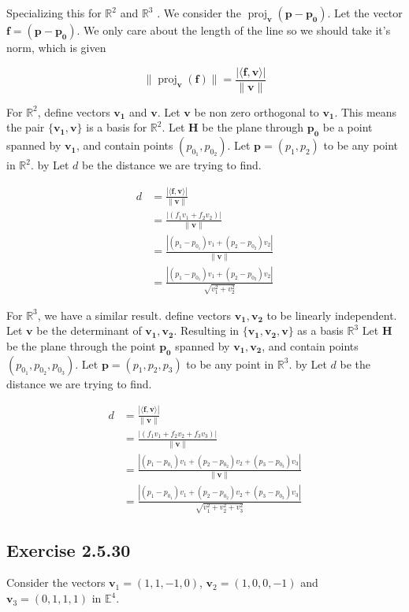\documentclass{tufte-book}
\DeclareMathOperator{\proj}{proj}
\newcommand{\vct}{\mathbf}
\newcommand{\dprod}[2]{\langle #1, #2 \rangle}
\theoremstyle{mytheoremstyle}
\theoremstyle{mylemstyle}
\theoremstyle{mydefstyle}
\begin{document}
Specializing this for $\mathbb{R}^2$ and $\mathbb{R}^3$ . We consider the $\proj_\vct{v}(\vct{p} - \vct{p_0})$.  Let the vector $\vct{f} = (\vct{p} - \vct{p_0})$.  We only care about the length of the line so we should take it's norm, which is given

\[ \|\proj_\vct{v}(\vct{f})\| = \frac{|\dprod{\vct{f}}{\vct{v}}|}{\|\vct{v}\|} \]

For $\mathbb{R}^2$, define vectors $\vct{v_1}$ and $\vct{v}$.  Let $\vct{v}$  be non zero orthogonal to $\vct{v_1}$.  This means the pair $\{\vct{v_1}, \vct{v}\}$ is a basis for $\mathbb{R}^2$.  Let $\mathbf{H}$ be the plane through $\vct{p_0}$ be a point spanned by $\vct{v_1}$, and contain points $(p_{0_1}, p_{0_2})$.  Let $\vct{p} = (p_1, p_2)$ to be any point in $\mathbb{R}^2$.  by Let $d$ be the distance we are trying to find.

\begin{align*}
d &= \frac{|\dprod{\vct{f}}{\vct{v}}|}{\|\vct{v}\|} \\
&= \frac{|(f_1v_1 + f_2v_2)|}{\|\vct{v}\|} \\
&= \frac{|(p_1 - p_{0_1})v_1 + (p_2-p_{0_2})v_2|}{\|\vct{v}\|}\\
&= \frac{|(p_1 - p_{0_1})v_1 + (p_2-p_{0_2})v_2|}{\sqrt{v_1^2 + v_2^2}}
\end{align*}

For $\mathbb{R}^3$, we have a similar result. define vectors $\vct{v_1},\vct{v_2}$  to be linearly independent.  Let $\vct{v}$ be the determinant of $\vct{v_1},\vct{v_2}$.  Resulting in $\{\vct{v_1},\vct{v_2},\vct{v}\}$ as a basis $\mathbb{R}^3$ Let $\mathbf{H}$ be the plane through the point $\vct{p_0}$  spanned by $\vct{v_1},\vct{v_2}$, and contain points $(p_{0_1}, p_{0_2},p_{0_3})$. Let $\vct{p} = (p_1, p_2, p_3)$ to be any point in $\mathbb{R}^3$.  by Let $d$ be the distance we are trying to find.

\begin{align*}
d &= \frac{|\dprod{\vct{f}}{\vct{v}}|}{\|\vct{v}\|} \\
&= \frac{|(f_1v_1 + f_2v_2 + f_3v_3 )|}{\|\vct{v}\|} \\
&= \frac{|(p_1 - p_{0_1})v_1 + (p_2-p_{0_2})v_2 + (p_3-p_{0_3})v_3|}{\|\vct{v}\|}\\
&= \frac{|(p_1 - p_{0_1})v_1 + (p_2-p_{0_2})v_2+ (p_3-p_{0_3})v_3|}{\sqrt{v_1^2 + v_2^2 + v_3^2}}
\end{align*}

\subsection{Exercise 2.5.30}
Consider the vectors $\vct{v}_1 = (1,1,-1,0)$, $\vct{v}_2=(1,0,0,-1)$ and $\vct{v}_3=(0,1,1,1)$ in $\mathbb{E}^4$.
\end{document}
